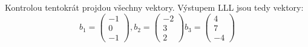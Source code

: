\documentclass[12pt, a4paper]{article}
\begin{document}
Kontrolou tentokrát projdou všechny vektory. Výstupem LLL jsou tedy vektory:
\[
b_1 = \begin{pmatrix}
-1\\
0\\
-1
\end{pmatrix},
b_2 = \begin{pmatrix}
-2\\
3\\
2
\end{pmatrix}
b_3 = \begin{pmatrix}
4\\
7\\
-4
\end{pmatrix}
\]
\end{document}
